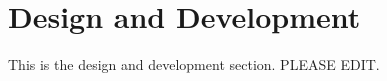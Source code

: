 \section{Design and Development}
\label{sec:designanddevelopment}

This is the design and development section. PLEASE EDIT.